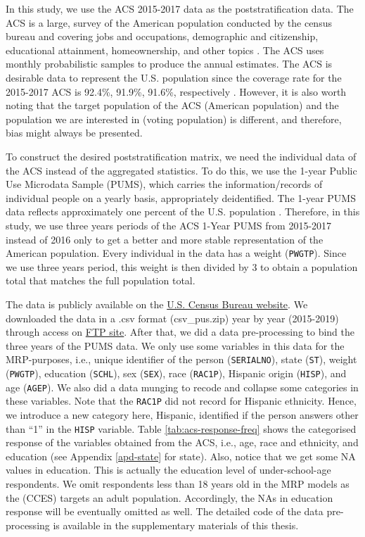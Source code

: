 \documentclass{monashthesis}
\begin{document}
In this study, we use the ACS 2015-2017 data as the poststratification data. The ACS is a large, survey of the American population conducted by the census bureau and covering jobs and occupations, demographic and citizenship, educational attainment, homeownership, and other topics \autocite{acs_data_about}. The ACS uses monthly probabilistic samples to produce the annual estimates. The ACS is desirable data to represent the U.S. population since the coverage rate for the 2015-2017 ACS is 92.4\%, 91.9\%, 91.6\%, respectively \autocite{acs_coverage_rate}. However, it is also worth noting that the target population of the ACS (American population) and the population we are interested in (voting population) is different, and therefore, bias might always be presented.

To construct the desired poststratification matrix, we need the individual data of the ACS instead of the aggregated statistics. To do this, we use the 1-year Public Use Microdata Sample (PUMS), which carries the information/records of individual people on a yearly basis, appropriately deidentified. The 1-year PUMS data reflects approximately one percent of the U.S. population \autocite{pums_metadata}. Therefore, in this study, we use three years periods of the ACS 1-Year PUMS from 2015-2017 instead of 2016 only to get a better and more stable representation of the American population. Every individual in the data has a weight (\texttt{PWGTP}). Since we use three years period, this weight is then divided by 3 to obtain a population total that matches the full population total.

The data is publicly available on the \href{https://www.census.gov/programs-surveys/acs/microdata/access.2015.html}{U.S. Census Bureau website}. We downloaded the data in a .csv format (csv\_pus.zip) year by year (2015-2019) through access on \href{https://www2.census.gov/programs-surveys/acs/data/pums/2015/1-Year/}{FTP site}. After that, we did a data pre-processing to bind the three years of the PUMS data. We only use some variables in this data for the MRP-purposes, i.e., unique identifier of the person (\texttt{SERIALNO}), state (\texttt{ST}), weight (\texttt{PWGTP}), education (\texttt{SCHL}), sex (\texttt{SEX}), race (\texttt{RAC1P}), Hispanic origin (\texttt{HISP}), and age (\texttt{AGEP}). We also did a data munging to recode and collapse some categories in these variables. Note that the \texttt{RAC1P} did not record for Hispanic ethnicity. Hence, we introduce a new category here, Hispanic, identified if the person answers other than ``1'' in the \texttt{HISP} variable. Table \ref{tab:acs-response-freq} shows the categorised response of the variables obtained from the ACS, i.e., age, race and ethnicity, and education (see Appendix \ref{apd-state} for state). Also, notice that we get some NA values in education. This is actually the education level of under-school-age respondents. We omit respondents less than 18 years old in the MRP models as the (CCES) targets an adult population. Accordingly, the NAs in education response will be eventually omitted as well. The detailed code of the data pre-processing is available in the supplementary materials of this thesis.
\end{document}
